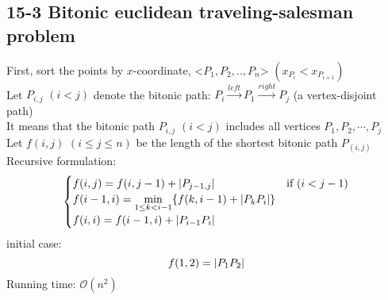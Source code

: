 \subsection*{15-3 Bitonic euclidean traveling-salesman problem}
\noindent First, sort the points by $x$-coordinate, <$P_1, P_2, .., P_n$> $(x_{P_i} < x_{P_{i + 1}})$ \\
Let $P_{i, j}$ $(i < j)$ denote the bitonic path: $P_i \xrightarrow{left} P_1 \xrightarrow{right} P_j$ (a vertex-disjoint path) \\
It means that the bitonic path $P_{i, j}$ $(i < j)$ includes all vertices $P_1, P_2, \cdots, P_j$ \\
Let $f(i, j)$ $(i \leq j \leq n)$ be the length of the shortest bitonic path $P_(i, j)$ \\
Recursive formulation:
\begin{equation} \notag
\begin{cases}
	f(i, j) = f(i, j - 1) + \left\lvert P_{j - 1, j} \right\rvert & \mbox{if } (i < j - 1) \\
	f(i - 1, i) = \displaystyle{\min_{1 \leq k < i - 1}} \{f(k, i - 1) + \left\lvert P_k P_i \right\rvert\} \\
	f(i, i) = f(i - 1, i) + \left\lvert P_{i - 1}P_i \right\rvert
\end{cases}
\end{equation}
initial case:
\begin{equation} \notag
	f(1, 2) = \left\lvert P_1 P_2 \right\rvert
\end{equation}
Running time: $\mathcal{O}(n^2)$

